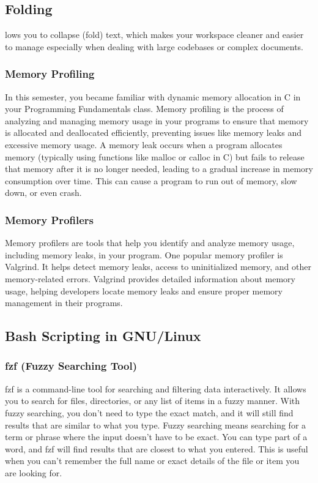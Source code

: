 \subsection{Folding}
lows you to collapse (fold) text, which makes your workspace cleaner and easier to manage
especially when dealing with large codebases or complex documents.

\subsubsection{Memory Profiling}
In this semester, you became familiar with dynamic memory allocation in C in your Programming Fundamentals class. Memory profiling is the process of analyzing and managing memory usage in your programs to ensure that memory is allocated and deallocated efficiently, preventing issues like memory leaks and excessive memory usage.
A memory leak occurs when a program allocates memory (typically using functions like malloc or calloc in C) but fails to release that memory after it is no longer needed, leading to a gradual increase in memory consumption over time. This can cause a program to run out of memory, slow down, or even crash.
\subsubsection{Memory Profilers}
Memory profilers are tools that help you identify and analyze memory usage, including memory leaks, in your program. One popular memory profiler is Valgrind. It helps detect memory leaks, access to uninitialized memory, and other memory-related errors.
Valgrind provides detailed information about memory usage, helping developers locate memory leaks and ensure proper memory management in their programs.

\subsection{ Bash Scripting in GNU/Linux}
\subsubsection{ fzf (Fuzzy Searching Tool)}
fzf is a command-line tool for searching and filtering data interactively. It allows you to search for files, directories, or any list of items in a fuzzy manner. With fuzzy searching, you don't need to type the exact match, and it will still find results that are similar to what you type.
Fuzzy searching means searching for a term or phrase where the input doesn't have to be exact. You can type part of a word, and fzf will find results that are closest to what you entered. This is useful when you can't remember the full name or exact details of the file or item you are looking for.

